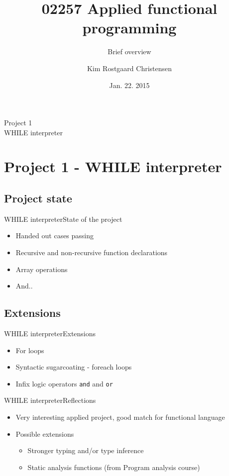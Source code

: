 \documentclass{beamer}
\title{02257 Applied functional programming}
\subtitle{Brief overview}
\author{Kim Rostgaard Christensen}
\institute[Techical University of Denmark] %
{
  
  DTU Compute\\
  Techical University of Denmark}
\date{Jan. 22. 2015}
\begin{document}
\begin{frame}
  \titlepage
\end{frame}

\begin{frame}[plain,c]
\begin{center}
\Huge Project 1\\
\vspace{5mm}
\Large WHILE interpreter
\end{center}
\end{frame}

\section{Project 1 - WHILE interpreter}
\subsection{Project state}

\begin{frame}{WHILE interpreter}{State of the project}
  \begin{itemize}
  \item {
    Handed out cases passing
  }
  \item {
    Recursive and non-recursive function declarations
  }
  \item {
    Array operations
  }
  \pause
  \item {
    And..
  }
  \end{itemize}
\end{frame}

\subsection{Extensions}
\begin{frame}{WHILE interpreter}{Extensions}
  \begin{itemize}
  \item {
    For loops
  }
  \item {
    Syntactic sugarcoating - foreach loops
  }
  \item {
    Infix logic operators \alert{\texttt{and}} and \alert{\texttt{or}}
  }
  \end{itemize}
\end{frame}

\begin{frame}{WHILE interpreter}{Reflections}
  \begin{itemize}
  \item {
    Very interesting applied project, good match for functional language
  }
  \item {
    Possible extensions
  }
  \begin{itemize}
    \item Stronger typing and/or type inference
    \item Static analysis functions (from Program analysis course)
    \end{itemize}
  \end{itemize}
\end{frame}
\end{document}
